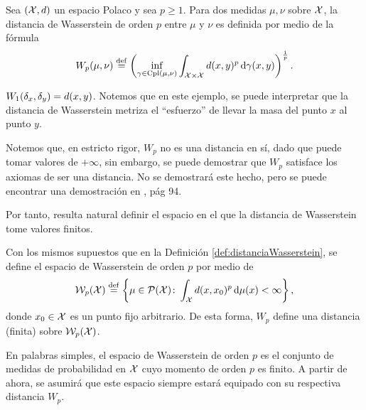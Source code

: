 {{	  \begin{definition}\label{def:distanciaWasserstein}
		  Sea $(\cX, d)$ un espacio Polaco y sea $p \geq 1$. Para dos medidas $\mu, \nu$ sobre $\cX$, la distancia de Wasserstein de orden $p$ entre $\mu$ y $\nu$ es definida por medio de la fórmula
		  \begin{equation}
			  \label{eq:distanciaWasserstein}
			  \Wasserstein[p]{\mu}{\nu}  \eqdef \left( \inf_{\gamma \in \Cpl(\mu, \nu)} \int_{\cX \times \cX} d(x, y)^{p} \dgamma[x, y] \right)^{\frac{1}{p}}.
		  \end{equation}

	  \end{definition}

	  \begin{example}
		  $\Wasserstein[1]{\delta_x}{\delta_y} = d(x, y)$. Notemos que en este ejemplo, se puede interpretar que la distancia de Wasserstein metriza el ``esfuerzo'' de llevar la masa del punto $x$ al punto $y$.
	  \end{example}

	  Notemos que, en estricto rigor, $W_p$ no es una distancia en sí, dado que puede tomar valores de $+\infty$, sin embargo, se puede demostrar que $W_p$ satisface los axiomas de ser una distancia. No se demostrará este hecho, pero se puede encontrar una demostración en \cite{villani2009optimal}, pág 94.

	  Por tanto, resulta natural definir el espacio en el que la distancia de Wasserstein tome valores finitos.

	  \begin{definition}
		  Con los mismos supuestos que en la Definición \ref{def:distanciaWasserstein}, se define el espacio de Wasserstein de orden $p$ por medio de
		  \begin{equation}
			  \WassersteinSpace[p]{\cX} \eqdef \left\{
			  \mu \in \ProbSpace[\cX] \colon \int_{\cX} d(x, x_0)^{p} \dmu[x] < \infty
			  \right\},
		  \end{equation}
		  donde $x_0 \in \cX$ es un punto fijo arbitrario. De esta forma, $W_p$ define una distancia (finita) sobre $\WassersteinSpace[p]{\cX}$.
	  \end{definition}

	  En palabras simples, el espacio de Wasserstein de orden $p$ es el conjunto de medidas de probabilidad en $\cX$ cuyo momento de orden $p$ es finito. A partir de ahora, se asumirá que este espacio siempre estará equipado con su respectiva distancia $W_p$.

}}
